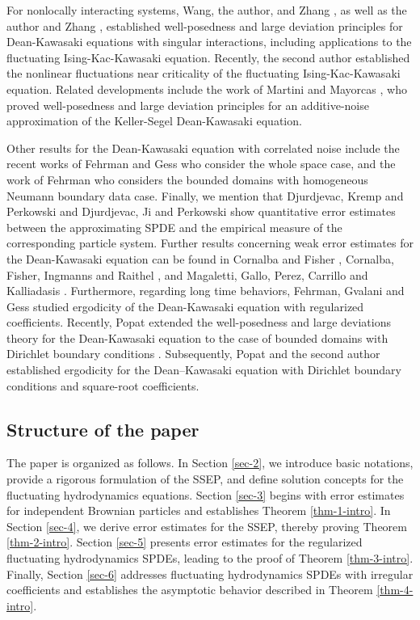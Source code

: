 \documentclass[UTF-8,reqno]{amsart}
\numberwithin{equation}{section}
\begin{document}
For nonlocally interacting systems, Wang, the author, and Zhang \cite{WWZ22}, as well as the author and Zhang \cite{WZ24}, established well-posedness and large deviation principles for Dean-Kawasaki equations with singular interactions, including applications to the fluctuating Ising-Kac-Kawasaki equation. Recently, the second author \cite{W25} established the nonlinear fluctuations near criticality of the fluctuating Ising-Kac-Kawasaki equation. Related developments include the work of Martini and Mayorcas \cite{AA25,AA24}, who proved well-posedness and large deviation principles for an additive-noise approximation of the Keller-Segel Dean-Kawasaki equation. 

Other results for the Dean-Kawasaki equation with correlated noise include the recent works of Fehrman and Gess \cite{fehrman2024conservative} who consider the whole space case, and the work of Fehrman \cite{fehrman2025stochastic} who considers the bounded domains with homogeneous Neumann boundary data case.
Finally, we mention that Djurdjevac, Kremp and Perkowski \cite{djurdjevac2022weak} and Djurdjevac, Ji and Perkowski \cite{djurdjevac2025weak} show quantitative error estimates between the approximating SPDE and the empirical measure of the corresponding particle system. Further results concerning weak error estimates for the Dean-Kawasaki equation can be found in Cornalba and Fisher \cite{CF23-arma}, Cornalba, Fisher, Ingmanns and Raithel \cite{CFIR26}, and Magaletti, Gallo, Perez, Carrillo and Kalliadasis \cite{MGPCK22}. Furthermore, regarding long time behaviors, Fehrman, Gvalani and Gess \cite{fehrman2022ergodicity} studied ergodicity of the Dean-Kawasaki equation with regularized coefficients. Recently, Popat extended the well-posedness and large deviations theory for the Dean-Kawasaki equation to the case of bounded domains with Dirichlet boundary conditions \cite{Shyam25,Shyam25-fluc}. Subsequently, Popat and the second author \cite{PW25} established ergodicity for the Dean--Kawasaki equation with Dirichlet boundary conditions and square-root coefficients.
 

\subsection{Structure of the paper} 
The paper is organized as follows. In Section \ref{sec-2}, we introduce basic notations, provide a rigorous formulation of the SSEP, and define solution concepts for the fluctuating hydrodynamics equations. Section \ref{sec-3} begins with error estimates for independent Brownian particles and establishes Theorem \ref{thm-1-intro}. In Section \ref{sec-4}, we derive error estimates for the SSEP, thereby proving Theorem \ref{thm-2-intro}. Section \ref{sec-5} presents error estimates for the regularized fluctuating hydrodynamics SPDEs, leading to the proof of Theorem \ref{thm-3-intro}. Finally, Section \ref{sec-6} addresses fluctuating hydrodynamics SPDEs with irregular coefficients and establishes the asymptotic behavior described in Theorem \ref{thm-4-intro}. 
\end{document}
